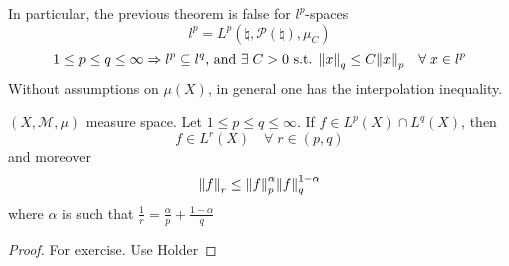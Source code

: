 In particular, the previous theorem is false for \(l^p\)-spaces
\[
    l^p = L^p(\natural, \mathcal{P}(\natural), \mu_C)
\]
\[
    1 \leq p \leq q \leq \infty \Rightarrow l^p \subseteq l^q \text{, and } \exists \; C>0 \text{ s.t. } \norm{x}_q \leq C \norm{x}_p \quad \forall\; x \in l^p
\]
Without assumptions on \(\mu(X)\), in general one has the interpolation inequality.
\begin{theorem}
    \((X, \mathcal{M}, \mu)\) measure space. 
    Let \(1 \leq p \leq q \leq \infty\). If \(f \in L^p(X) \cap L^q(X)\), then 
    \[
        f \in L^r(X) \quad \forall \; r \in (p, q)
    \]
    and moreover 
    \[
        \norm{f}_r \leq \norm{f}_p^\alpha \norm{f}_q^{1-\alpha}
    \]
    where \(\alpha\) is such that \(\frac{1}{r}=\frac{\alpha}{p} + \frac{1-\alpha}{q}\)
\end{theorem}
\begin{proof}
    For exercise. Use Holder
\end{proof}

